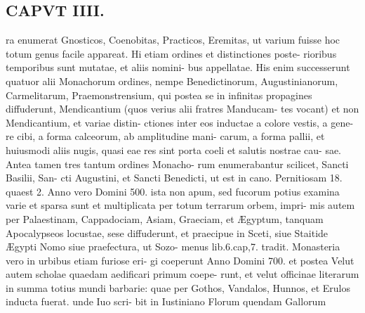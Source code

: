 \documentclass{article}
\begin{document}
\begin{pages}
\section*{CAPVT  IIII. }
\marginpar{[ p.219 ]}ra enumerat Gnosticos, Coenobitas, Practicos, Eremitas, ut varium fuisse hoc totum genus facile appareat. Hi etiam ordines et distinctiones poste- rioribus temporibus sunt mutatae, et aliis nomini- bus appellatae. His enim successerunt quatuor alii Monachorum ordines, nempe Benedictinorum, Augustinianorum, Carmelitarum, Praemonstrensium, qui postea se in infinitas propagines diffuderunt, Mendicantium (quos verius alii fratres Manducam- tes vocant) et non Mendicantium, et variae distin- ctiones inter eos inductae a colore vestis, a gene- re cibi, a forma calceorum, ab amplitudine mani- carum, a forma pallii, et huiusmodi aliis nugis, quasi eae res sint porta coeli et salutis nostrae cau- sae. Antea tamen tres tantum ordines Monacho- rum enumerabantur scilicet, Sancti Basilii, San- cti Augustini, et Sancti Benedicti, ut est in cano. Pernitiosam 18. quaest 2. Anno vero Domini 500. ista non apum, sed fucorum potius examina varie et sparsa sunt et multiplicata per totum terrarum orbem, impri- mis autem per Palaestinam, Cappadociam, Asiam, Graeciam, et Ægyptum, tanquam Apocalypseos locustae, sese diffuderunt, et praecipue in Sceti, siue Staitide Ægypti Nomo siue praefectura, ut Sozo- menus lib.6.cap,7. tradit. Monasteria vero in urbibus etiam furiose eri- gi coeperunt Anno Domini 700. et postea Velut autem scholae quaedam aedificari primum coepe- runt, et velut officinae literarum in summa totius mundi barbarie: quae per Gothos, Vandalos, Hunnos, et Erulos inducta fuerat. unde Iuo scri- bit in Iustiniano Florum quendam Gallorum 

\end{pages}
\end{document}
